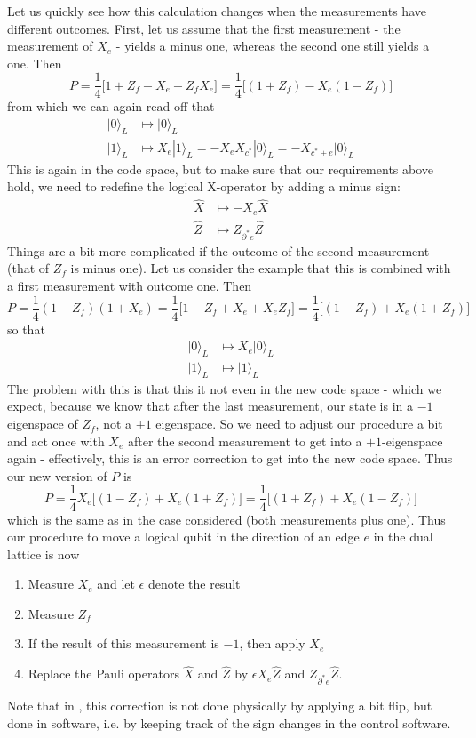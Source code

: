 \documentclass[a4paper, draft]{article}
\theoremstyle{own}
\theoremstyle{remark}
\begin{document}
Let us quickly see how this calculation changes when the measurements have different outcomes. First, let us assume that the first measurement - the measurement of $X_e$ - yields a minus one, whereas the second one still yields a one. Then 
$$
P = \frac{1}{4} \big[ 1 + Z_f - X_e - Z_f X_e \big]
= \frac{1}{4} \big[ (1 + Z_f) - X_e (1 -   Z_f) \big]
$$
from which we can again read off that
\begin{align*}
|0 \rangle_L &\mapsto |0 \rangle_L \\
|1 \rangle_L &\mapsto X_e |1 \rangle_L = - X_e X_{c^*} |0 \rangle_L = - X_{c^* + e} |0 \rangle_L
\end{align*}
This is again in the code space, but to make sure that our requirements above hold, we need to redefine the logical X-operator by adding a minus sign:
\begin{align*}
\hat{X} &\mapsto  - X_e \hat{X} \\
\hat{Z} &\mapsto Z_{\partial^* e} \hat{Z}
\end{align*}
Things are a bit more complicated if the outcome of the second measurement (that of $Z_f$ is minus one). Let us consider the example that this is combined with a first measurement with outcome one. Then
$$
P = \frac{1}{4} (1 - Z_f)(1 + X_e) = \frac{1}{4} \big[ 1 - Z_f + X_e +  X_e Z_f \big]
= \frac{1}{4} \big[ (1 - Z_f) + X_e (1 + Z_f) \big]
$$
so that
\begin{align*}
|0 \rangle_L &\mapsto X_e |0 \rangle_L \\
|1 \rangle_L &\mapsto |1  \rangle_L
\end{align*}
The problem with this is that this it not even in the new code space - which we expect, because we know that after the last measurement, our state is in a $-1$ eigenspace of $Z_f$, not a $+1$ eigenspace. So we need to adjust our procedure a bit and act once with $X_e$ after the second measurement to get into a $+1$-eigenspace again - effectively, this is an error correction to get into the new code space. Thus our new version of $P$ is
$$
P = \frac{1}{4} X_e \big[ (1 - Z_f) + X_e (1 + Z_f) \big]
= \frac{1}{4}  \big[ (1 + Z_f) +  X_e (1 - Z_f) \big]
$$
which is the same as in the case considered (both measurements plus one). Thus our procedure to move a logical qubit in the direction of an edge $e$ in the dual lattice is now
\begin{enumerate}
	\item Measure $X_e$ and let $\epsilon$ denote the result
	\item Measure $Z_f$
	\item If the result of this measurement is $-1$, then apply $X_e$
	\item Replace the Pauli operators $\hat{X}$ and $\hat{Z}$ by $\epsilon X_e \hat{Z}$ and $Z_{\partial^*e} \hat{Z}$. 
\end{enumerate}
Note that in \cite{SurfaceCodes}, this correction is not done physically by applying a bit flip, but done in software, i.e. by keeping track of the sign changes in the control software. 
\end{document}
